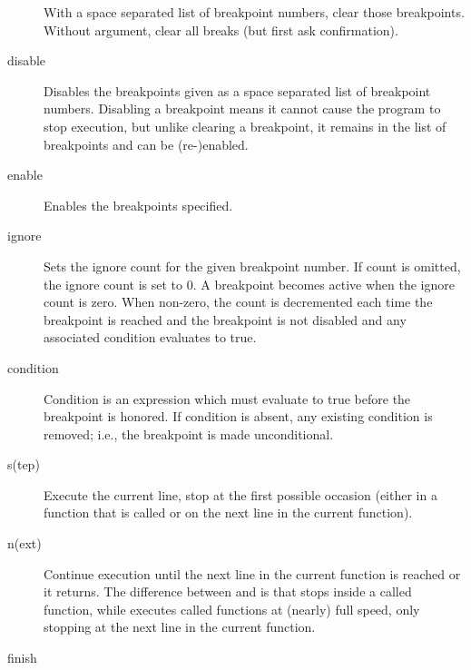 \begin{description}
With a space separated list of breakpoint numbers, clear those
breakpoints.  Without argument, clear all breaks (but first
ask confirmation).

\item[disable \optional{\var{bpnumber} \optional{\var{bpnumber \ldots}}}]

Disables the breakpoints given as a space separated list of
breakpoint numbers.  Disabling a breakpoint means it cannot cause
the program to stop execution, but unlike clearing a breakpoint, it
remains in the list of breakpoints and can be (re-)enabled.

\item[enable \optional{\var{bpnumber} \optional{\var{bpnumber \ldots}}}]

Enables the breakpoints specified.

\item[ignore \var{bpnumber} \optional{\var{count}}]

Sets the ignore count for the given breakpoint number.  If
count is omitted, the ignore count is set to 0.  A breakpoint
becomes active when the ignore count is zero.  When non-zero,
the count is decremented each time the breakpoint is reached
and the breakpoint is not disabled and any associated condition
evaluates to true.

\item[condition \var{bpnumber} \optional{\var{condition}}]

Condition is an expression which must evaluate to true before
the breakpoint is honored.  If condition is absent, any existing
condition is removed; i.e., the breakpoint is made unconditional.

\item[s(tep) \optional{\var{count}}]

Execute the current line, stop at the first possible occasion
(either in a function that is called or on the next line in the
current function).

\item[n(ext) \optional{\var{count}}]

Continue execution until the next line in the current function
is reached or it returns.  The difference between  and
 is that  stops inside a called function, while
 executes called functions at (nearly) full speed, only
stopping at the next line in the current function.

\item[finish]


\end{description}
